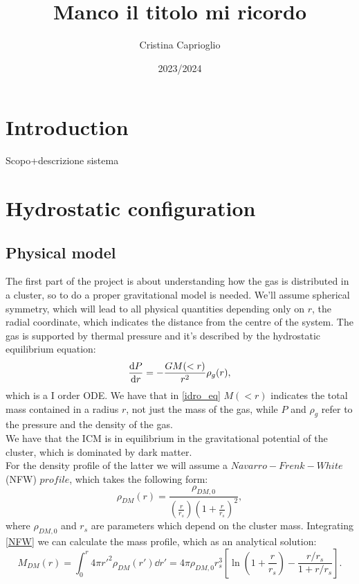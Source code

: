 \documentclass[]{article}
\title{Manco il titolo mi ricordo}
\author{Cristina Caprioglio}
\date{2023/2024 }
\begin{document}
\maketitle

\section{Introduction}
Scopo+descrizione sistema
\section{Hydrostatic configuration}
\subsection{Physical model}
The first part of the project is about understanding how the gas is distributed in a cluster, so to do a proper gravitational model is needed.
We'll assume spherical symmetry, which will lead to all physical quantities depending only on $r$, the radial coordinate, which indicates the distance from the centre of the system.
The gas is supported by thermal pressure and it's described by the hydrostatic equilibrium equation:
\begin{equation}\label{idro_eq}
	\derivative{P}{r}=-\frac{GM(<r)}{r^{2}}\rho_{g}(r),
\end{equation}
which is a I order ODE. We have that in \eqref{idro_eq} $M(<r)$ indicates the total mass contained in a radius $r$, not just the mass of the gas, while $P$ and $\rho_{g}$ refer to the pressure and the density of the gas. \\
We have that the ICM is in equilibrium in the gravitational potential of the cluster, which is dominated by dark matter. \\
For the density profile of the latter we will assume a $Navarro-Frenk-White$ (NFW) $profile$, which takes the following form:
\begin{equation}\label{NFW}
	\rho_{DM}(r)=\frac{\rho_{DM,0}}{\left(\frac{r}{r_{s}}\right)\left(1+\frac{r}{r_{s}}\right)^{2}},
\end{equation}
where $\rho_{DM,0}$ and $r_{s}$ are parameters which depend on the cluster mass. 
Integrating \eqref{NFW} we can calculate the mass profile, which as an analytical solution:
\begin{equation}\label{massDM}
	M_{DM}(r)=\int_{0}^{r}4\pi r'^{2}\rho_{DM}(r')\dd{r'}=4\pi\rho_{DM,0}r_{s}^{3}\left[\ln\left(1+\frac{r}{r_{s}}\right)-\frac{r/r_{s}}{1+r/r_{s}}\right].
\end{equation}
\end{document}
